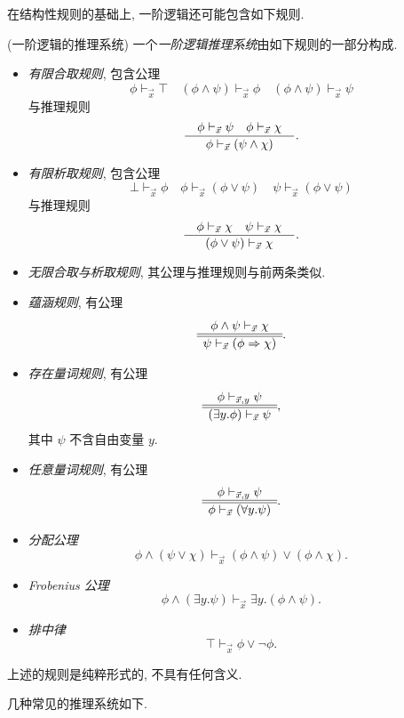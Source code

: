 在结构性规则的基础上, 一阶逻辑还可能包含如下规则.

\begin{definition}
	{(一阶逻辑的推理系统)}
	一个\emph{一阶逻辑推理系统}由如下规则的一部分构成.
	\begin{itemize}
		\item \emph{有限合取规则}, 包含公理
		$$
		\phi \vdash_{\vec x} \top
		\quad
		(\phi\wedge\psi)\vdash_{\vec x} \phi
		\quad
		(\phi\wedge\psi)\vdash_{\vec x} \psi
		$$
		与推理规则
		$$
		\frac{\quad \phi\vdash_{\vec x} \psi\quad \phi\vdash_{\vec x} \chi \quad}{\quad \phi\vdash_{\vec x} (\psi\wedge\chi) \quad}.
		$$
		\item \emph{有限析取规则}, 包含公理
		$$
		\bot \vdash_{\vec x} \phi
		\quad
		\phi \vdash_{\vec x} (\phi\vee\psi)
		\quad
		\psi \vdash_{\vec x} (\phi\vee\psi)
		$$
		与推理规则
		$$
		\frac{\quad \phi \vdash_{\vec x} \chi \quad \psi \vdash_{\vec x} \chi \quad}{\quad  (\phi\vee\psi)\vdash_{\vec x}\chi \quad}.
		$$
		\item \emph{无限合取与析取规则}, 其公理与推理规则与前两条类似.
		\item \emph{蕴涵规则}, 有公理
		$$
		\begin{array} {c} \phi\wedge\psi \vdash_{\vec x} \chi \\ \hline \hline \psi\vdash_{\vec x} (\phi\Rightarrow\chi) \end{array}.
		$$
		\item \emph{存在量词规则}, 有公理
		$$
		\begin{array} {c} \phi \vdash_{\vec x,y} \psi \\ \hline \hline (\exists y.\phi)\vdash_{\vec x} \psi \end{array},
		$$
		其中 $\psi$ 不含自由变量 $y$.
		\item \emph{任意量词规则}, 有公理
		$$
		\begin{array} {c} \phi \vdash_{\vec x,y} \psi \\ \hline \hline \phi\vdash_{\vec x} (\forall y.\psi) \end{array}.
		$$
		\item \emph{分配公理}
		$$
		\phi\wedge(\psi\vee\chi)\vdash_{\vec{x}}(\phi\wedge\psi)\vee(\phi\wedge\chi).
		$$
		\item \emph{Frobenius 公理}
		$$
		\phi\land(\exists y.\psi)\vdash_{\vec{x}}\exists y.(\phi\land\psi).
		$$
		\item \emph{排中律}
		$$
		\top\vdash_{\vec{x}}\phi\lor\neg\phi.
		$$
	\end{itemize}
\end{definition}

\begin{remark}
	{}
	上述的规则是纯粹形式的, 不具有任何含义.
\end{remark}

几种常见的推理系统如下.

